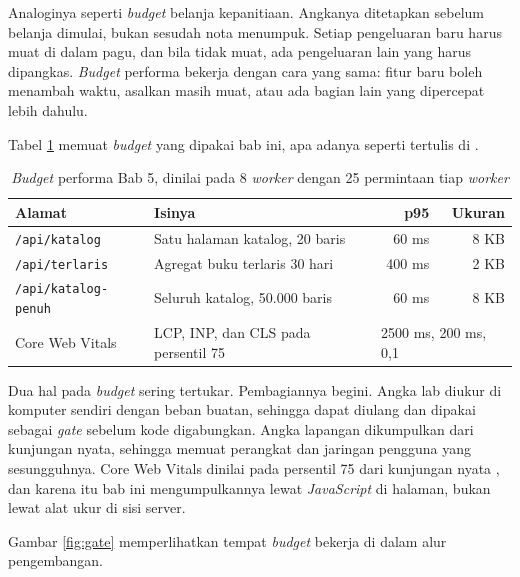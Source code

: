Analoginya seperti \textit{budget} belanja kepanitiaan. Angkanya ditetapkan sebelum
belanja dimulai, bukan sesudah nota menumpuk. Setiap pengeluaran baru harus
muat di dalam pagu, dan bila tidak muat, ada pengeluaran lain yang harus
dipangkas. \textit{Budget} performa bekerja dengan cara yang sama: fitur baru boleh
menambah waktu, asalkan masih muat, atau ada bagian lain yang dipercepat
lebih dahulu.

Tabel \ref{tab:budget} memuat \textit{budget} yang dipakai bab ini, apa adanya
seperti tertulis di .

\begin{table}[!htb]
  \centering
  \caption{\textit{Budget} performa Bab 5, dinilai pada 8 \textit{worker} dengan 25
           permintaan tiap \textit{worker}}
  \label{tab:budget}
  \begin{tabularx}{\textwidth}{lXrr}
    \hline
    \textbf{Alamat} & \textbf{Isinya} & \textbf{p95} & \textbf{Ukuran} \\
    \hline
    \texttt{/api/katalog} & Satu halaman katalog, 20 baris & 60 ms & 8 KB \\
    \hline
    \texttt{/api/terlaris} & Agregat buku terlaris 30 hari & 400 ms & 2 KB \\
    \hline
    \texttt{/api/katalog-penuh} & Seluruh katalog, 50.000 baris & 60 ms & 8 KB \\
    \hline
    Core Web Vitals & LCP, INP, dan CLS pada persentil 75 & \multicolumn{2}{l}{2500 ms, 200 ms, 0,1} \\
    \hline
  \end{tabularx}
\end{table}

Dua hal pada \textit{budget} sering tertukar. Pembagiannya begini. Angka lab diukur
di komputer sendiri dengan beban buatan, sehingga dapat diulang dan dipakai
sebagai \textit{gate} sebelum kode digabungkan. Angka lapangan dikumpulkan dari
kunjungan nyata, sehingga memuat perangkat dan jaringan pengguna yang
sesungguhnya. Core Web Vitals dinilai pada persentil 75 dari kunjungan nyata
\cite{webdev-vitals}, dan karena itu bab ini mengumpulkannya lewat
\textit{JavaScript} di halaman, bukan lewat alat ukur di sisi server.

Gambar \ref{fig:gate} memperlihatkan tempat \textit{budget} bekerja di dalam alur
pengembangan.

